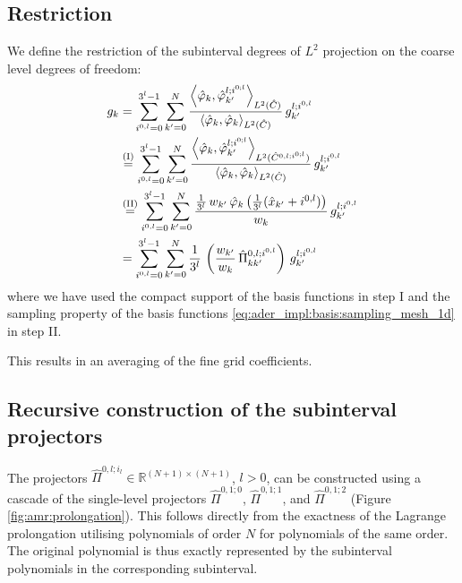 \documentclass{scrreprt}
\theoremstyle{definition}
\theoremstyle{nonumberplain}
\begin{document}
\subsection{Restriction}
We define the restriction of the subinterval degrees of 
$L^2$ projection on the coarse level degrees of freedom:
\begin{align}
g_k
&=
\sum_{i^{0,l}=0}^{3^l-1}
\sum_{k'=0}^N
\frac{
\left\langle
\hat{\varphi}_{k},
\hat{\varphi}_{k'}^{l;i^{0;l}}
\right\rangle
_{L^2(\hat{C})}
}
{
\left\langle
\hat{\varphi}_{k},
\hat{\varphi}_{k}
\right\rangle
_{L^2(\hat{C})}
}\,
g^{l;i^{0,l}}_{k'}
\\
&\overset{\textup{(I)}}{=}
\sum_{i^{0,l}=0}^{3^l-1}
\sum_{k'=0}^N
\frac{
\left\langle
\hat{\varphi}_{k},
\hat{\varphi}_{k'}^{l;i^{0;l}}
\right\rangle
_{L^2(\hat{C}^{0,l;i^{0;l}})}
}
{
\left\langle
\hat{\varphi}_{k},
\hat{\varphi}_{k}
\right\rangle
_{L^2(\hat{C})}
}\,
g^{l;i^{0,l}}_{k'}
\\
&\overset{\textup{(II)}}{=}
\sum_{i^{0,l}=0}^{3^l-1}
\sum_{k'=0}^N
\frac{
\frac{1}{3^l}\,
w_{k'}\,
\hat{\varphi}_{k}
\left(
\frac{1}{3^l} (\hat{x}_{k'}+i^{0,l})
\right)
}
{
w_k
}
\,
g^{l;i^{0,l}}_{k'}
\\
&=
\sum_{i^{0,l}=0}^{3^l-1}
\sum_{k'=0}^N
\frac{1}{3^l}\,
\left(
\frac{w_{k'}}{w_k}\,
\hat{\Pi}^{0,l;i^{0,l}}_{k k'}
\right)
\,
g^{l;i^{0,l}}_{k'}
\end{align}
where we have used the compact support of the basis functions 
in step I and the sampling property of the basis functions
\eqref{eq:ader_impl:basis:sampling_mesh_1d} in step II.

This results in an averaging of the fine grid coefficients.

\subsection{Recursive construction of the subinterval projectors}
The projectors $\hat{\Pi}^{0,l;i_l}\in\mathbb{R}^{(N+1)\times(N+1)}$, $l>0$,
can be constructed using a cascade of the single-level
projectors $\hat{\Pi}^{0,1;0}$, $\hat{\Pi}^{0,1;1}$, and $\hat{\Pi}^{0,1;2}$
(Figure \ref{fig:amr:prolongation}).
This follows directly from the exactness of the Lagrange prolongation
utilising polynomials of order $N$ for polynomials of the same order.
The original polynomial is thus
exactly represented by the subinterval polynomials in
the corresponding subinterval.
\end{document}
